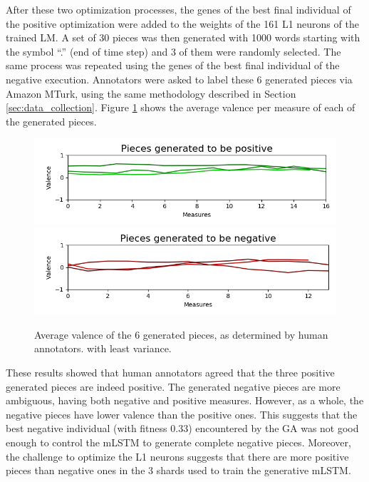 After these two optimization processes, the genes of the best final individual of the positive optimization were added to the weights of the 161 L1 neurons of the trained LM. A set of 30 pieces was then generated with 1000 words starting with the symbol ``.'' (end of time step) and 3 of them were randomly selected. The same process was repeated using the genes of the best final individual of the negative execution. Annotators were asked to label these 6 generated pieces via Amazon MTurk, using the same methodology described in Section \ref{sec:data_collection}. Figure \ref{fig:generated_eval} shows the average valence per measure of each of the generated pieces.

\begin{figure}[!h]
 \includegraphics[width=\columnwidth]{imgs/ismir19/means_pos.png}
 \includegraphics[width=\columnwidth]{imgs/ismir19/means_neg.png}
 \caption{Average valence of the 6 generated pieces, as determined by human annotators.
 with least variance.}
 \label{fig:generated_eval}
\end{figure}

These results showed that human annotators agreed that the three positive generated pieces are indeed positive. The generated negative pieces are more ambiguous, having both negative and positive measures. However, as a whole, the negative pieces have lower valence than the positive ones. This suggests that the best negative individual (with fitness $0.33$) encountered by the GA was not good enough to control the mLSTM to generate complete negative pieces. Moreover, the challenge to optimize the L1 neurons suggests that there are more positive pieces than negative ones in the 3 shards used to train the generative mLSTM.

